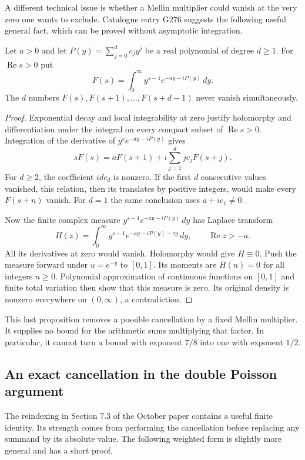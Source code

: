 A different technical issue is whether a Mellin multiplier
could vanish at the very zero one wants to exclude.
Catalogue entry G276 suggests the following useful general
fact, which can be proved without asymptotic integration.

\begin{proposition}
\label{prop:qrh-mellin-family}
Let $a>0$ and let $P(y)=\sum_{j=0}^d c_jy^j$ be a real
polynomial of degree $d\ge1$. For
$\operatorname{Re}s>0$ put
\[
 F(s)=\int_0^\infty y^{s-1}e^{-ay-iP(y)}\,dy.
\]
The $d$ numbers $F(s),F(s+1),\ldots,F(s+d-1)$ never
vanish simultaneously.
\end{proposition}
\begin{proof}
Exponential decay and local integrability at zero justify
holomorphy and differentiation under the integral on every
compact subset of $\operatorname{Re}s>0$.
Integration of the derivative of
$y^s e^{-ay-iP(y)}$ gives
\[
 sF(s)=aF(s+1)+i\sum_{j=1}^d j c_jF(s+j).
\]
For $d\ge2$, the coefficient $idc_d$ is nonzero.
If the first $d$ consecutive values vanished, this relation,
then its translates by positive integers, would make every
$F(s+n)$ vanish. For $d=1$ the same conclusion uses
$a+ic_1\ne0$.

Now the finite complex measure
$y^{s-1}e^{-ay-iP(y)}\,dy$ has Laplace transform
\[
 H(z)=\int_0^\infty y^{s-1}e^{-ay-iP(y)-zy}\,dy,
       \qquad\operatorname{Re}z>-a.
\]
All its derivatives at zero would vanish. Holomorphy
would give $H\equiv0$. Push the measure forward under
$u=e^{-y}$ to $[0,1]$. Its moments are $H(n)=0$ for
all integers $n\ge0$. Polynomial approximation of
continuous functions on $[0,1]$ and finite total variation
then show that this measure is zero. Its original density
is nonzero everywhere on $(0,\infty)$, a contradiction.
\end{proof}

This last proposition removes a possible cancellation by
a fixed Mellin multiplier. It supplies no bound for the
arithmetic sums multiplying that factor. In particular,
it cannot turn a bound with exponent $7/8$ into one with
exponent $1/2$.

\subsection{An exact cancellation in the double Poisson argument}

The reindexing in Section 7.3 of the October paper contains a useful
finite identity. Its strength comes from performing the cancellation
before replacing any summand by its absolute value. The following
weighted form is slightly more general and has a short proof.

